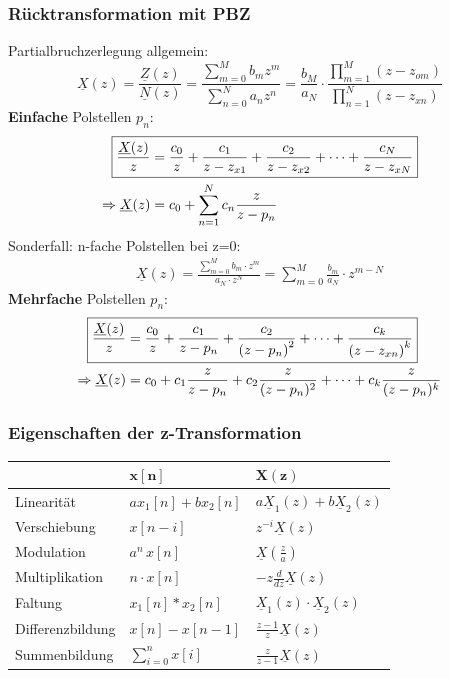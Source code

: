 \begin{multicols*}{2}
\subsubsection{Rücktransformation mit PBZ}
Partialbruchzerlegung allgemein:
\[
\underline{X}(z)=\frac{\underline{Z}(z)}{\underline{N}(z)}=\frac{\sum_{m=0}^{M} b_{m} z^{m}}{\sum_{n=0}^{N} a_{n} z^{n}}=\frac{b_{M}}{a_{N}} \cdot \frac{\prod_{m=1}^{M}\left(z-z_{o m}\right)}{\prod_{n=1}^{N}\left(z-z_{x n}\right)}
\]
\textbf{Einfache} Polstellen $p_n$:
\begin{align*}
	\Aboxed{\frac{\underline{X}(z)}{z} & =\frac{c_{0}}{z}+\frac{c_{1}}{z-z_{x 1}}+\frac{c_{2}}{z-z_{x 2}}+\cdots+\frac{c_{N}}{z-z_{x N}}} \\
	\Rightarrow \underline{X}(z) &= c_0 + \sum_{n=1}^{N} c_n \frac{z}{z-p_n}
\end{align*}
Sonderfall: n-fache Polstellen bei z=0:
\begin{align*}
	\underline{X}(z) = \frac{\sum_{m=0}^{M} b_m \cdot  z^m}{a_N \cdot z^N} = \sum_{m=0}^{M} \frac{b_m}{a_N} \cdot z^{m-N}
\end{align*}
\textbf{Mehrfache} Polstellen $p_n$:
\begin{align*}
	\Aboxed{\frac{\underline{X}(z)}{z} &=\frac{c_{0}}{z}+\frac{c_{1}}{z-p_n}+\frac{c_{2}}{\left(z-p_n\right)^{2}}+\cdots+\frac{c_{k}}{\left(z-z_{x n}\right)^{k}}}\\
			\Rightarrow \underline{X}(z) & = c_0 + c_1 \frac{z}{z-p_n}+c_2\frac{z}{(z-p_n)^2}+\cdots+c_k\frac{z}{(z-p_n)^k}
\end{align*}

\subsubsection{Eigenschaften der z-Transformation}
\renewcommand{\arraystretch}{1.7}
\begin{tabularx}{\columnwidth}{|X|X|X|}
	\hline
	& $\mathbf{x[n]}$ & \underline{$\mathbf{X}$}$\mathbf{(z)}$\\
	\hline Linearität & $a x_{1}[n]+b x_{2}[n]$ & $a \underline{X}_{1}(z)+b\underline{X}_{2}(z)$ \\
	\hline Verschiebung	& $x[n-i]$ & $z^{-i} \underline{X}(z)$ \\
	\hline Modulation & $a^{n} \, x[n]$ & $\underline{X}\left(\frac{z}{a}\right)$ \\
	\hline Multiplikation & $n \cdot x[n] $ & $-z \frac{d}{d z} \underline{X}(z)$ \\
	\hline Faltung & $x_{1}[n] * x_{2}[n] $ & $ \underline{X}_{1}(z) \cdot \underline{X}_{2}(z)$ \\
	\hline Differenzbildung & $x[n]-x[n-1] $ & $ \frac{z-1}{z} \underline{X}(z)$ \\
	\hline Summenbildung & $\sum_{i=0}^{n} x[i] $ & $ \frac{z}{z-1} \underline{X}(z)$ \\
	\hline
\end{tabularx}


\end{multicols*}
